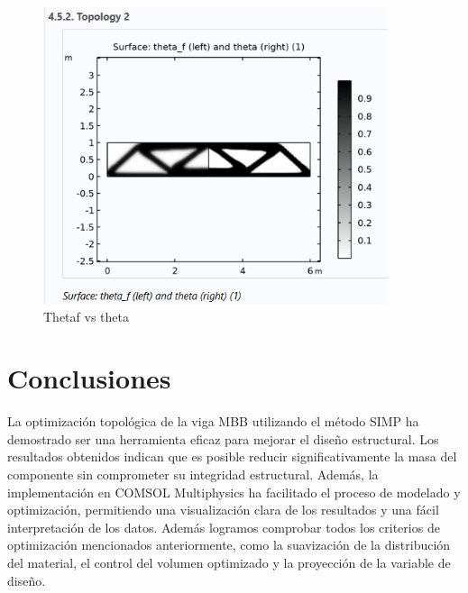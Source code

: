 \documentclass{article}
\theoremstyle{mytheoremstyle}
\theoremstyle{mytheoremstyle}
\theoremstyle{myproblemstyle}
\begin{document}
            \begin{figure}[H]
              \centering
              \includegraphics[width=0.9\textwidth]{theta.png}
              \caption{Thetaf vs theta} 
              \label{fig:imagen_x}
            \end{figure}
          \section{Conclusiones}
La optimización topológica de la viga MBB utilizando el método SIMP ha demostrado ser una herramienta eficaz para mejorar el diseño estructural. Los resultados obtenidos indican que es posible reducir significativamente la masa del componente sin comprometer su integridad estructural. Además, la implementación en COMSOL Multiphysics ha facilitado el proceso de modelado y optimización, permitiendo una visualización clara de los resultados y una fácil interpretación de los datos. 
Además logramos comprobar todos los criterios de optimización mencionados anteriormente, como la suavización de la distribución del material, el control del volumen optimizado y la proyección de la variable de diseño. 
\nocite{*}

\end{document}
